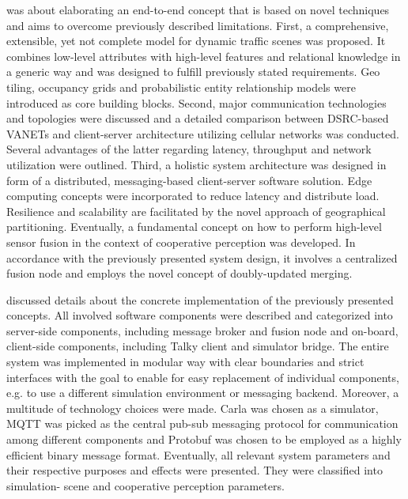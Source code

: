  was about elaborating an end-to-end concept that is based on novel techniques and aims to overcome previously described limitations. First, a comprehensive, extensible, yet not complete model for dynamic traffic scenes was proposed. It combines low-level attributes with high-level features and relational knowledge in a generic way and was designed to fulfill previously stated requirements. Geo tiling, occupancy grids and probabilistic entity relationship models were introduced as core building blocks.
Second, major communication technologies and topologies were discussed and a detailed comparison between DSRC-based VANETs and client-server architecture utilizing cellular networks was conducted. Several advantages of the latter regarding latency, throughput and network utilization were outlined.
Third, a holistic system architecture was designed in form of a distributed, messaging-based client-server software solution. Edge computing concepts were incorporated to reduce latency and distribute load. Resilience and scalability are facilitated by the novel approach of geographical partitioning.
Eventually, a fundamental concept on how to perform high-level sensor fusion in the context of cooperative perception was developed. In accordance with the previously presented system design, it involves a centralized fusion node and employs the novel concept of doubly-updated merging. 
\par
\bigskip

 discussed details about the concrete implementation of the previously presented concepts. All involved software components were described and categorized into server-side components, including message broker and fusion node and on-board, client-side components, including Talky client and simulator bridge. The entire system was implemented in modular way with clear boundaries and strict interfaces with the goal to enable for easy replacement of individual components, e.g. to use a different simulation environment or messaging backend. Moreover, a multitude of technology choices were made. Carla was chosen as a simulator, MQTT was picked as the central pub-sub messaging protocol for communication among different components and Protobuf was chosen to be employed as a highly efficient binary message format. Eventually, all relevant system parameters and their respective purposes and effects were presented. They were classified into simulation- scene and cooperative perception parameters. 
\par
\bigskip

